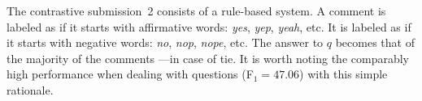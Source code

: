  
The contrastive submission~2 consists of a rule-based system. A comment is 
labeled as \yes if it starts with affirmative words: \textit{yes}, 
\textit{yep}, \textit{yeah}, etc. It is labeled as \no if it starts with 
negative words: \textit{no}, \textit{nop}, \textit{nope}, etc. The answer to $q$ 
becomes that of the majority of the comments ---\unsure in case of tie. It is 
worth noting the comparably high performance when dealing with \unsure questions 
(F$_1=47.06$) with this simple rationale.